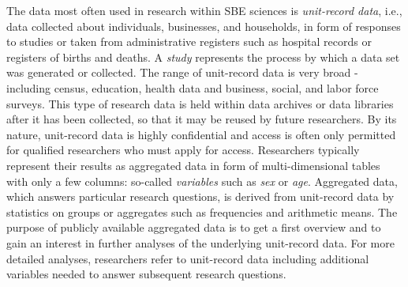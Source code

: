 \documentclass[conference]{IEEEtran}
\begin{document}
The data most often used in research within SBE sciences is \emph{unit-record data}, i.e., data collected about individuals, businesses, and households, in form of responses to studies or taken from administrative registers such as hospital records or registers of births and deaths. A \emph{study} represents the process by which a data set was generated or collected. The range of unit-record data is very broad - including census, education, health data and business, social, and labor force surveys. This type of research data is held within data archives or data libraries after it has been collected, so that it may be reused by future researchers. By its nature, unit-record data is highly confidential and access is often only permitted for qualified researchers who must apply for access. Researchers typically represent their results as aggregated data in form of multi-dimensional tables with only a few columns: so-called \emph{variables} such as \emph{sex} or \emph{age}. Aggregated data, which answers particular research questions, is derived from unit-record data by statistics on groups or aggregates such as frequencies and arithmetic means. The purpose of publicly available aggregated data is to get a first overview and to gain an interest in further analyses of the underlying unit-record data. For more detailed analyses, researchers refer to unit-record data including additional variables needed to answer subsequent research questions. 
\end{document}
